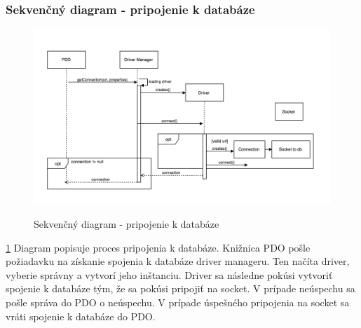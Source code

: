 \documentclass[12pt,a4paper]{article}
\begin{document}
\subsubsection{Sekvenčný diagram -  pripojenie k databáze}
\begin{figure}[H]
	\caption{Sekvenčný diagram - pripojenie k databáze}
	\includegraphics[width=\textwidth]{db}
	\label{fig:db}
\end{figure}
\ref{fig:db}
Diagram popisuje proces pripojenia k databáze. Knižnica PDO pošle požiadavku na získanie spojenia k databáze driver manageru. Ten načíta driver, vyberie správny a vytvorí jeho inštanciu. Driver sa následne pokúsi vytvoriť spojenie k databáze tým, že sa pokúsi pripojiť na socket. V prípade neúspechu sa pošle správa do PDO o neúspechu. V prípade úspešného pripojenia na socket sa vráti spojenie k databáze do PDO.
\end{document}
